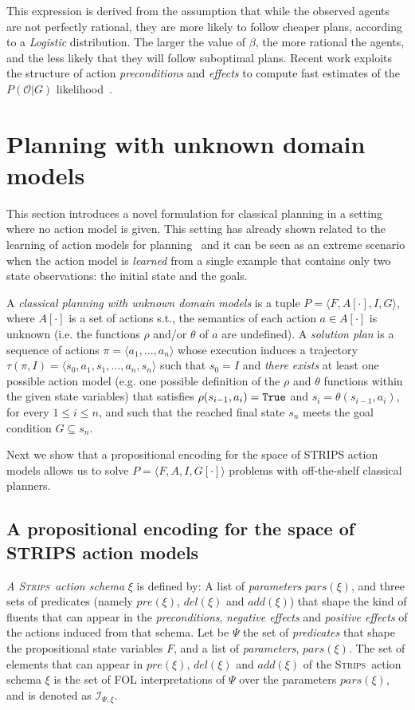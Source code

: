 \documentclass{article}
\newcommand{\tup}[1]{{\langle #1 \rangle}}
\newcommand{\strips}{\textsc{Strips}}
\begin{document}
This expression is derived from the assumption that while the observed agents are not perfectly rational, they are more likely to follow cheaper plans, according to a {\em Logistic} distribution. The larger the value of $\beta$, the more rational the agents, and the less likely that they will follow suboptimal plans. Recent work exploits the structure of action {\em preconditions} and {\em effects} to compute fast estimates of the $P(\mathcal{O}|G)$ likelihood~\cite{pereira2017landmark}.



\section{Planning with unknown domain models}
\label{sec:planning}
This section introduces a novel formulation for classical planning in a setting where no action model is given. This setting has already shown related to the learning of action models for planning~\cite{SternJ17} and it can be seen as an extreme scenario when the action model is {\em learned} from a single example that contains only two state observations: the initial state and the goals.

A {\em classical planning with unknown domain models} is a tuple $P=\tup{F,A[\cdot],I,G}$, where $A[\cdot]$ is a set of actions s.t., the semantics of each action $a\in A[\cdot]$ is unknown (i.e. the functions $\rho$ and/or $\theta$ of $a$ are undefined). A {\em solution plan} is a sequence of actions $\pi=\tup{a_1, \ldots, a_n}$ whose execution induces a trajectory $\tau(\pi,I)=\tup{s_0, a_1, s_1, \ldots, a_n, s_n}$ such that $s_0=I$ and {\em there exists} at least one possible action model (e.g. one possible definition of the $\rho$ and $\theta$ functions within the given state variables) that satisfies $\rho(s_{i-1},a_i)={\tt\small True}$ and $s_i=\theta(s_{i-1},a_i)$, for every {\small $1\leq i\leq n$}, and such that the reached final state $s_n$ meets the goal condition $G \subseteq s_n$. 

Next we show that a propositional encoding for the space of STRIPS action models allows us to solve $P=\tup{F,A,I,G[\cdot]}$ problems with off-the-shelf classical planners.


\subsection{A propositional encoding for the space of STRIPS action models}
{\em A \strips\ action schema} $\xi$ is defined by: A list of {\em parameters} $pars(\xi)$, and three sets of predicates (namely $pre(\xi)$, $del(\xi)$ and $add(\xi)$) that shape the kind of fluents that can appear in the {\em preconditions}, {\em negative effects} and {\em positive effects} of the actions induced from that schema. Let be $\Psi$ the set of {\em predicates} that shape the propositional state variables $F$, and a list of {\em parameters}, $pars(\xi)$. The set of elements that can appear in $pre(\xi)$, $del(\xi)$ and $add(\xi)$ of the \strips\ action schema $\xi$ is the set of FOL interpretations of $\Psi$ over the parameters $pars(\xi)$, and is denoted as ${\mathcal I}_{\Psi,\xi}$.
\end{document}
